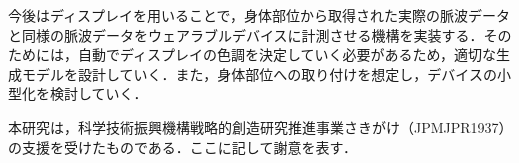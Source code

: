 \documentclass[Japanese,noauthor]{dicomopapers}
\begin{document}
今後はディスプレイを用いることで，身体部位から取得された実際の脈波データと同様の脈波データをウェアラブルデバイスに計測させる機構を実装する．そのためには，自動でディスプレイの色調を決定していく必要があるため，適切な生成モデルを設計していく．また，身体部位への取り付けを想定し，デバイスの小型化を検討していく．



\begin{acknowledgment}
  本研究は，科学技術振興機構戦略的創造研究推進事業さきがけ（JPMJPR1937）の支援を受けたものである．ここに記して謝意を表す．
\end{acknowledgment}




\end{document}
